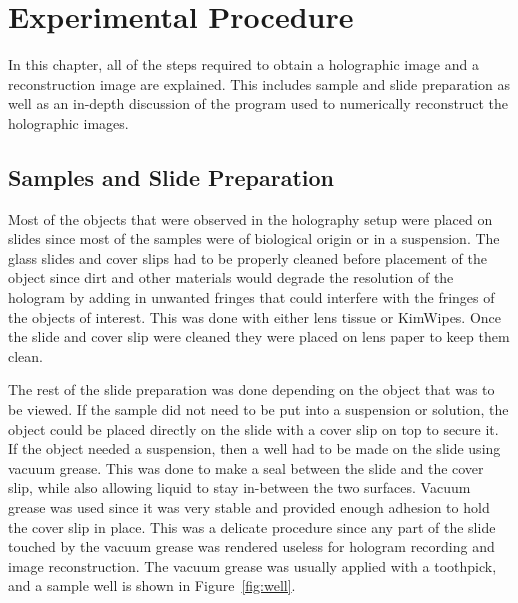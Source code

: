 %
%

\chapter{Experimental Procedure} \label{chap:Experimental}

In this chapter, all of the steps required to obtain a holographic image and
a reconstruction image are explained. This includes sample and slide
preparation as well as
an in-depth discussion of the program used to numerically reconstruct the holographic
images.

\section{Samples and Slide Preparation}

Most of the objects that were observed in the holography setup were placed on slides
%
%
since most of the samples were of biological origin or in a suspension. 
The glass slides and cover slips had to be properly cleaned before placement of
the object
since dirt and other materials would degrade the
resolution of the hologram by adding in unwanted fringes that could interfere
with the fringes of the objects of interest. This was done with either lens
tissue or KimWipes\texttrademark.
Once the slide and cover slip were cleaned they
were placed on lens paper to keep them clean.

The rest of the slide preparation was done depending on the object that was to be
viewed. If the sample did not need to be put into a suspension or solution,
the object could be placed directly on the slide with a cover slip on top to
secure it.
If the object needed a suspension, then a well had to be made on the slide
using vacuum grease.
This was done to make a seal between the
slide and the cover slip, while also allowing liquid to stay in-between the two
surfaces. Vacuum grease was used since it was very stable and provided enough
adhesion to hold the cover slip in place.
This was a delicate procedure since any part of the slide touched by the
vacuum grease was rendered useless for hologram recording and image reconstruction. The vacuum
grease was usually applied with a toothpick, and a
sample well is shown in Figure~\ref{fig:well}.

